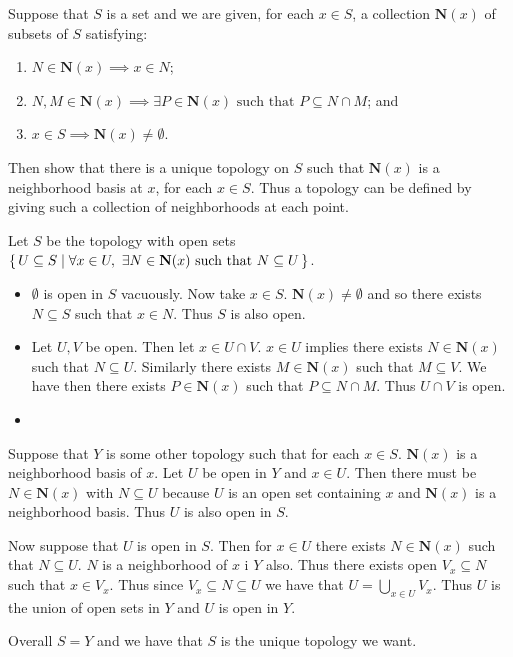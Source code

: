 \documentclass[letterpaper, 11pt]{article}
\begin{document}
\clearpage

\begin{exercise}
  Suppose that $S$ is a set and we are given, for each $x \in S$, a collection $\textbf{N}(x)$ of subsets of $S$ satisfying:
  \begin{enumerate}
  \item $N \in \textbf{N}(x) \implies x \in N$;
  \item $N, M \in \textbf{N}(x) \implies \exists P \in \textbf{N}(x) \text{ such that } P \subseteq N \cap M$; and
  \item $x \in S \implies \textbf{N}(x) \neq \emptyset$.
  \end{enumerate}
  Then show that there is a unique topology on $S$ such that $\textbf{N}(x)$ is a neighborhood basis at $x$, for each $x \in S$.
  Thus a topology can be defined by giving such a collection of neighborhoods at each point.
\end{exercise}
\begin{pf}
  Let $S$ be the topology with open sets $\set{U \subseteq S | \forall x \in U,~ \exists N \in \textbf{N}(x) \text{ such that } N \subseteq U}$.
  \begin{itemize}
  \item $\emptyset$ is open in $S$ vacuously.
        Now take $x \in S$.
        $\textbf{N}(x) \neq \emptyset$ and so there exists $N \subseteq S$ such that $x \in N$.
        Thus $S$ is also open.
  \item Let $U, V$ be open.
        Then let $x \in U \cap V$.
        $x \in U$ implies there exists $N \in \textbf{N}(x)$ such that $N \subseteq U$.
        Similarly there exists $M \in \textbf{N}(x)$ such that $M \subseteq V$.
        We have then there exists $P \in \textbf{N}(x)$ such that $P \subseteq N \cap M$.
        Thus $U \cap V$ is open.
  \item {}
  \end{itemize}

  Suppose that $Y$ is some other topology such that for each $x \in S$. $\textbf{N}(x)$ is a neighborhood basis of $x$.
  Let $U$ be open in $Y$ and $x \in U$.
  Then there must be $N \in \textbf{N}(x)$ with $N \subseteq U$ because $U$ is an open set containing $x$ and $\textbf{N}(x)$ is a neighborhood basis.
  Thus $U$ is also open in $S$.

  Now suppose that $U$ is open in $S$.
  Then for $x \in  U$ there exists $N \in \textbf{N}(x)$ such that $N \subseteq U$.
  $N$ is a neighborhood of $x$ i $Y$ also.
  Thus there exists open $V_{x} \subseteq N$ such that $x \in V_{x}$.
  Thus since $V_{x} \subseteq N \subseteq U$ we have that $U = \bigcup_{x \in U} V_{x}$.
  Thus $U$ is the union of open sets in $Y$ and $U$ is open in $Y$.

  Overall $S = Y$ and we have that $S$ is the unique topology we want.
\end{pf}
\end{document}

